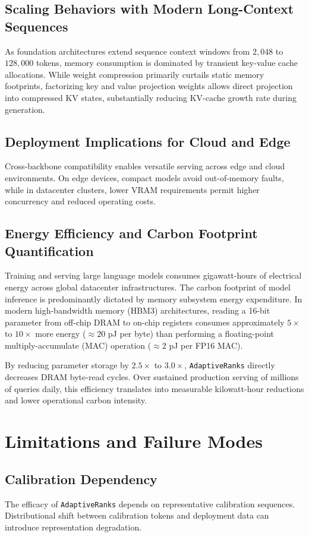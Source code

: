 \subsection{Scaling Behaviors with Modern Long-Context Sequences}
As foundation architectures extend sequence context windows from $2{,}048$ to $128{,}000$ tokens, memory consumption is dominated by transient key-value cache allocations. While weight compression primarily curtails static memory footprints, factorizing key and value projection weights allows direct projection into compressed KV states, substantially reducing KV-cache growth rate during generation.

\subsection{Deployment Implications for Cloud and Edge}
Cross-backbone compatibility enables versatile serving across edge and cloud environments. On edge devices, compact models avoid out-of-memory faults, while in datacenter clusters, lower VRAM requirements permit higher concurrency and reduced operating costs.

\subsection{Energy Efficiency and Carbon Footprint Quantification}
Training and serving large language models consumes gigawatt-hours of electrical energy across global datacenter infrastructures. The carbon footprint of model inference is predominantly dictated by memory subsystem energy expenditure. In modern high-bandwidth memory (HBM3) architectures, reading a 16-bit parameter from off-chip DRAM to on-chip registers consumes approximately $5\times$ to $10\times$ more energy ($\approx 20$ pJ per byte) than performing a floating-point multiply-accumulate (MAC) operation ($\approx 2$ pJ per FP16 MAC).

By reducing parameter storage by $2.5\times$ to $3.0\times$, \texttt{AdaptiveRanks} directly decreases DRAM byte-read cycles. Over sustained production serving of millions of queries daily, this efficiency translates into measurable kilowatt-hour reductions and lower operational carbon intensity.


\section{Limitations and Failure Modes}

\subsection{Calibration Dependency}
The efficacy of \texttt{AdaptiveRanks} depends on representative calibration sequences. Distributional shift between calibration tokens and deployment data can introduce representation degradation.

